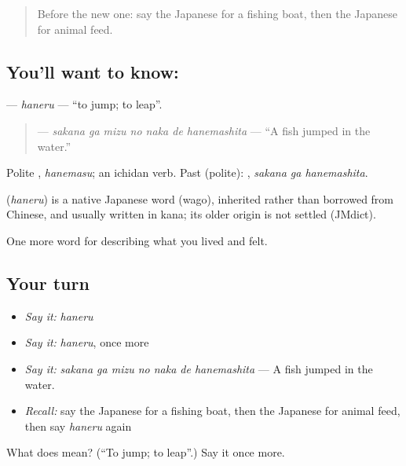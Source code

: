 \label{lesson:JA-C490-haneru}



\begin{quote}
Before the new one: say the Japanese for a fishing boat, then the Japanese for animal feed.
\end{quote}

\subsection*{You'll want to know: }
\textbf{} — \emph{haneru} — \textquotedblleft{}to jump; to leap\textquotedblright{}.

\begin{quote}
\textbf{   } — \emph{sakana ga mizu no naka de hanemashita} — \textquotedblleft{}A fish jumped in the water.\textquotedblright{}
\end{quote}

Polite \textbf{}, \emph{hanemasu}; an ichidan verb. Past (polite): \textbf{ }, \emph{sakana ga hanemashita}.

\begin{cousinweb}
\textbf{} (\emph{haneru}) is a native Japanese word (wago), inherited rather than borrowed from Chinese, and usually written in kana; its older origin is not settled (JMdict).
\end{cousinweb}

\begin{grammarlens}[title={What you've built}]
One more word for describing what you lived and felt.
\end{grammarlens}

\subsection*{Your turn}
\begin{itemize}
\raggedright
  \item \emph{Say it:} \emph{haneru}
  \item \emph{Say it:} \emph{haneru}, once more
  \item \emph{Say it:} \emph{sakana ga mizu no naka de hanemashita} — A fish jumped in the water.
  \item \emph{Recall:} say the Japanese for a fishing boat, then the Japanese for animal feed, then say \emph{haneru} again
\end{itemize}

\begin{tcolorbox}[breakable,colback=teal!4,colframe=teal!35!black,title={Before you move on}]
What does  mean? (\textquotedblleft{}To jump; to leap\textquotedblright{}.) Say it once more.
\end{tcolorbox}
